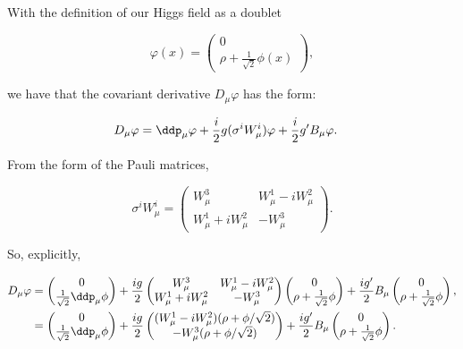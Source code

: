 \section{}

With the definition of our Higgs field as a doublet

\begin{equation}
  \varphi(x) = \begin{pmatrix}0 \\ \rho + \frac{1}{\sqrt{2}}\phi(x)\end{pmatrix},
\end{equation}

we have that the covariant derivative $D_\mu\varphi$ has the form:

\begin{align}
  D_\mu\varphi &= \ddp_\mu\varphi + \frac{i}{2} g (\sigma^iW_\mu^i) \varphi + \frac{i}{2}g'B_\mu\varphi.
\end{align}

From the form of the Pauli matrices,

\begin{equation}
  \sigma^iW_\mu^i = \begin{pmatrix}W_\mu^3 & W_\mu^1 - iW_\mu^2 \\ W_\mu^1 + iW_\mu^2 & -W_\mu^3\end{pmatrix}.
\end{equation}

So, explicitly,

\begin{align}
  D_\mu\varphi &= \begin{pmatrix}0 \\ \frac{1}{\sqrt{2}} \ddp_\mu\phi\end{pmatrix} + \frac{ig}{2}\begin{pmatrix}W_\mu^3 & W_\mu^1 - iW_\mu^2 \\ W_\mu^1 + iW_\mu^2 & -W_\mu^3\end{pmatrix}\begin{pmatrix}0 \\ \rho + \frac{1}{\sqrt{2}}\phi\end{pmatrix} + \frac{ig'}{2}B_\mu \begin{pmatrix}0 \\ \rho + \frac{1}{\sqrt{2}}\phi\end{pmatrix}, \\
               &= \begin{pmatrix}0 \\ \frac{1}{\sqrt{2}} \ddp_\mu\phi\end{pmatrix} + \frac{ig}{2}\begin{pmatrix}(W_\mu^1 - iW_\mu^2)(\rho + \phi/\sqrt{2}) \\ -W_\mu^3(\rho + \phi/\sqrt{2})\end{pmatrix} + \frac{ig'}{2}B_\mu \begin{pmatrix}0 \\ \rho + \frac{1}{\sqrt{2}}\phi\end{pmatrix}.
\end{align}

